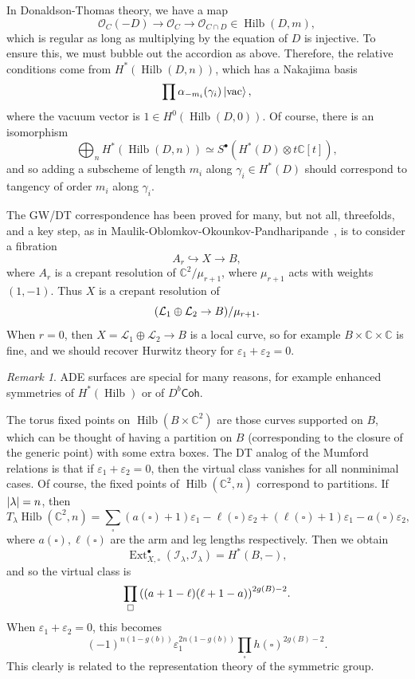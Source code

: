 \documentclass[leqno, openany]{memoir}
\theoremstyle{definition}
\theoremstyle{remark}
\newtheorem{rmk}[thm]{Remark}
\theoremstyle{plain}
\theoremstyle{definition}
\theoremstyle{remark}
\newcommand{\C}{\mathbb{C}}
\newcommand{\ep}{\varepsilon}
\newcommand{\mc}[1]{\mathcal{#1}}
\newcommand{\mr}[1]{\mathrm{#1}}
\newcommand{\ms}[1]{\mathsf{#1}}
\DeclareMathOperator{\Ext}{Ext}
\DeclareMathOperator{\Hilb}{Hilb}
\begin{document}
In Donaldson-Thomas theory, we have a map
\[ \mc{O}_C(-D) \to \mc{O}_C \to \mc{O}_{C \cap D} \in \Hilb(D, m), \]
which is regular as long as multiplying by the equation of $D$ is injective. To ensure this, we must bubble out the accordion as above. Therefore, the relative conditions come from $H^*(\Hilb(D, n))$, which has a Nakajima basis
\[ \prod \alpha_{-m_i}(\gamma_i) \ket{\mr{vac}}, \]
where the vacuum vector is $1 \in H^0(\Hilb(D, 0))$. Of course, there is an isomorphism
\[ \bigoplus_n H^*(\Hilb(D, n)) \simeq S^{\bullet}(H^*(D) \otimes t \C[t]), \]
and so adding a subscheme of length $m_i$ along $\gamma_i \in H^*(D)$ should correspond to tangency of order $m_i$ along $\gamma_i$.

The GW/DT correspondence has been proved for many, but not all, threefolds, and a key step, as in Maulik-Oblomkov-Okounkov-Pandharipande~\cite{moop}, is to consider a fibration
\[ A_r \hookrightarrow X \to B, \]
where $A_r$ is a crepant resolution of $\C^2/\mu_{r+1}$, where $\mu_{r+1}$ acts with weights $(1, -1)$. Thus $X$ is a crepant resolution of 
\[ \qty(\mc{L}_1 \oplus \mc{L}_2 \to B) / \mu_{r+1}. \]
When $r = 0$, then $X = \mc{L}_1 \oplus \mc{L}_2 \to B$ is a local curve, so for example $B \times \C \times \C$ is fine, and we should recover Hurwitz theory for $\ep_1 + \ep_2 = 0$.

\begin{rmk}
    ADE surfaces are special for many reasons, for example enhanced symmetries of $H^*(\Hilb)$ or of $D^b \ms{Coh}$.
\end{rmk}

The torus fixed points on $\Hilb(B \times \C^2)$ are those curves supported on $B$, which can be thought of having a partition on $B$ (corresponding to the closure of the generic point) with some extra boxes. The DT analog of the Mumford relations is that if $\ep_1 + \ep_2 = 0$, then the virtual class vanishes for all nonminimal cases. Of course, the fixed points of $\Hilb(\C^2, n)$ correspond to partitions. If $\abs{\lambda} = n$, then
\[ T_{\lambda} \Hilb(\C^2, n) = \sum_{\square} (a(\square) + 1) \ep_1 - \ell(\square) \ep_2 + (\ell(\square) + 1) \ep_1 - a(\square) \ep_2, \]
where $a(\square), \ell(\square)$ are the arm and leg lengths respectively. Then we obtain
\[ \Ext^{\bullet}_{X, \circ} (\mc{I}_{\lambda}, \mc{I}_{\lambda}) = H^*(B, -), \]
and so the virtual class is
\[ \prod_{\square} \qty((a+1-\ell)(\ell+1-a))^{2g(B)-2}. \]
When $\ep_1 + \ep_2 = 0$, this becomes
\[ (-1)^{n(1-g(b))} \ep_1^{2n(1-g(b))} \prod_{\square} h(\square)^{2g(B)-2}. \]
This clearly is related to the representation theory of the symmetric group.
\end{document}
